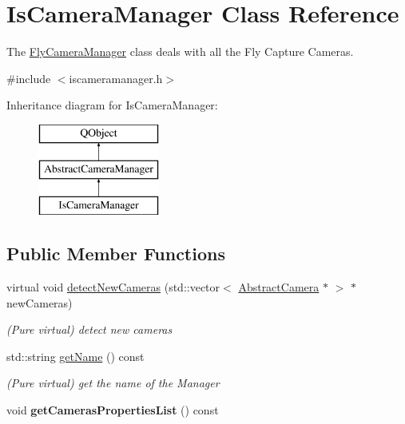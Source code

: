 \hypertarget{class_is_camera_manager}{\section{Is\-Camera\-Manager Class Reference}
\label{class_is_camera_manager}
}


The \hyperlink{class_fly_camera_manager}{Fly\-Camera\-Manager} class deals with all the Fly Capture Cameras.  




{\ttfamily \#include $<$iscameramanager.\-h$>$}

Inheritance diagram for Is\-Camera\-Manager\-:\begin{figure}[H]
\begin{center}
\leavevmode
\includegraphics[height=3.000000cm]{class_is_camera_manager}
\end{center}
\end{figure}
\subsection*{Public Member Functions}
\begin{DoxyCompactItemize}
\item 
virtual void \hyperlink{class_is_camera_manager_a4b65e770537668dffca47cbf6af34dfb}{detect\-New\-Cameras} (std\-::vector$<$ \hyperlink{class_abstract_camera}{Abstract\-Camera} $\ast$ $>$ $\ast$new\-Cameras)
\begin{DoxyCompactList}\small\item\em (Pure virtual) detect new cameras \end{DoxyCompactList}\item 
std\-::string \hyperlink{class_is_camera_manager_a86228372c8903914acc3764e9358163b}{get\-Name} () const 
\begin{DoxyCompactList}\small\item\em (Pure virtual) get the name of the Manager \end{DoxyCompactList}\item 
\hypertarget{class_is_camera_manager_a505c0eef8802a84ecc777112d4fcdc32}{void {\bfseries get\-Cameras\-Properties\-List} () const }\label{class_is_camera_manager_a505c0eef8802a84ecc777112d4fcdc32}

\end{DoxyCompactItemize}
